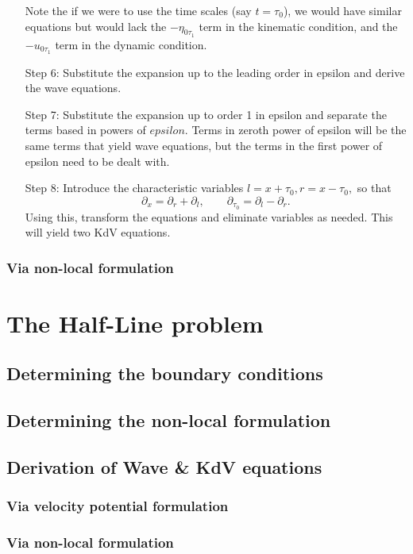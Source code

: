 \documentclass[10pt,reqno,oneside,a4paper]{article}
\begin{document}
\begin{enumerate}
Note the if we were to use the time scales (say $t = \tau_0$), we would have similar equations but would lack the $-\eta_{0\tau_1}$ term in the kinematic condition, and the $-u_{0\tau_1}$ term in the dynamic condition.
\item[Step 6:] Substitute the expansion up to the leading order in epsilon and derive the wave equations.
\item[Step 7:] Substitute the expansion up to order 1 in epsilon and separate the terms based in powers of $epsilon.$  Terms in zeroth power of epsilon will be the same terms that yield wave equations, but the terms in the first power of epsilon need to be dealt with.
\item[Step 8:] Introduce the characteristic variables $l = x + \tau_0, r = x - \tau_0,$ so that 
\[ \partial_x = \partial_r + \partial_l, \qquad \partial_{\tau_0} = \partial_l - \partial_r.\]
Using this, transform the equations and eliminate variables as needed. This will yield two KdV equations.
\end{enumerate}
\subsubsection{Via non-local formulation}

\section{The Half-Line problem}

\subsection{Determining the boundary conditions}

\subsection{Determining the non-local formulation}

\subsection{Derivation of Wave \& KdV equations}

\subsubsection{Via velocity potential formulation}

\subsubsection{Via non-local formulation}


{\small}
\end{document}
